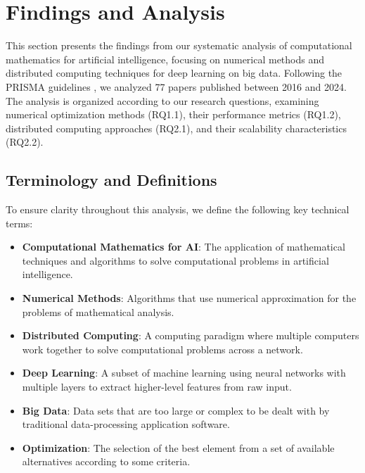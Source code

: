 \section{Findings and Analysis}

\sloppy


This section presents the findings from our systematic analysis of computational mathematics for artificial intelligence, focusing on numerical methods and distributed computing techniques for deep learning on big data. Following the PRISMA guidelines \citep{moher2009preferred}, we analyzed 77 papers published between 2016 and 2024. The analysis is organized according to our research questions, examining numerical optimization methods (RQ1.1), their performance metrics (RQ1.2), distributed computing approaches (RQ2.1), and their scalability characteristics (RQ2.2).

\subsection{Terminology and Definitions}
To ensure clarity throughout this analysis, we define the following key technical terms:
\begin{itemize}
    \item \textbf{Computational Mathematics for AI}: The application of mathematical techniques and algorithms to solve computational problems in artificial intelligence.
    \item \textbf{Numerical Methods}: Algorithms that use numerical approximation for the problems of mathematical analysis.
    \item \textbf{Distributed Computing}: A computing paradigm where multiple computers work together to solve computational problems across a network.
    \item \textbf{Deep Learning}: A subset of machine learning using neural networks with multiple layers to extract higher-level features from raw input.
    \item \textbf{Big Data}: Data sets that are too large or complex to be dealt with by traditional data-processing application software.
    \item \textbf{Optimization}: The selection of the best element from a set of available alternatives according to some criteria.
\end{itemize}

